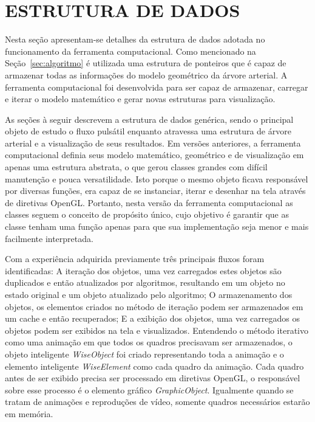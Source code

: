 \documentclass[a4paper,12pt]{monografia}
\theoremstyle{plain}
\theoremstyle{definition}
\theoremstyle{remark}
\begin{document}
\section{ESTRUTURA DE DADOS}\label{sec:estrutura}

Nesta seção apresentam-se detalhes da estrutura de dados adotada no funcionamento da ferramenta computacional. Como mencionado na Seção~\ref{sec:algoritmo} é utilizada uma estrutura de ponteiros que é capaz de armazenar todas as informações do modelo geométrico da árvore arterial. A ferramenta computacional foi desenvolvida para ser capaz de armazenar, carregar e iterar o modelo matemático e gerar novas estruturas para visualização.

As seções à seguir descrevem a estrutura de dados genérica, sendo o principal objeto de estudo o fluxo pulsátil enquanto atravessa uma estrutura de árvore arterial e a visualização de seus resultados. Em versões anteriores, a ferramenta computacional  definia seus modelo matemático, geométrico e de visualização em apenas uma estrutura abstrata, o que gerou classes grandes com difícil manutenção e pouca versatilidade. Isto porque o mesmo objeto ficava responsável por diversas funções, era capaz de se instanciar, iterar e desenhar na tela através de diretivas OpenGL. Portanto, nesta versão da ferramenta computacional as classes seguem o conceito de propósito único, cujo objetivo é garantir que as classe tenham uma função apenas para que sua implementação seja menor e mais facilmente interpretada.

Com a experiência adquirida previamente três principais fluxos foram identificadas:  A iteração dos objetos, uma vez carregados estes objetos são duplicados e então atualizados por algoritmos, resultando em um objeto no estado original e um objeto atualizado pelo algoritmo; O armazenamento dos objetos, os elementos criados no método de iteração podem ser armazenados em um cache e então recuperados;  E a exibição dos objetos, uma vez carregados os objetos podem ser exibidos na tela e visualizados. Entendendo o método iterativo como uma animação em que todos os quadros precisavam ser armazenados, o objeto inteligente \textit{WiseObject} foi criado representando toda a animação e o elemento inteligente \textit{WiseElement} como cada quadro da animação. Cada quadro antes de ser exibido precisa ser processado em diretivas OpenGL, o responsável sobre esse processo é o elemento gráfico \textit{GraphicObject}. Igualmente quando se tratam de animações e reproduções de vídeo, somente quadros necessários estarão em memória. 
\end{document}
